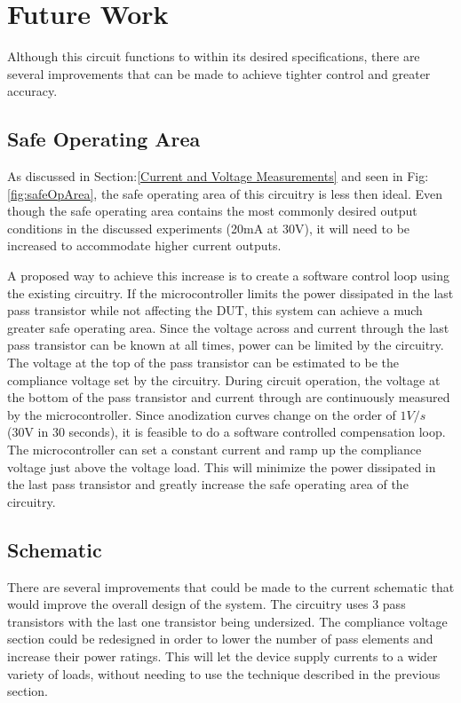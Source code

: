 \section{Future Work}

Although this circuit functions to within its desired specifications, there are several improvements that can be made to achieve tighter control and greater accuracy.

\subsection{Safe Operating Area}

As discussed in Section:\ref{Current and Voltage Measurements} and seen in Fig:\ref{fig:safeOpArea}, the safe operating area of this circuitry is less then ideal. Even though the safe operating area contains the most commonly desired output conditions in the discussed experiments (20mA at 30V), it will need to be increased to accommodate higher current outputs.

A proposed way to achieve this increase is to create a software control loop using the existing circuitry. If the microcontroller limits the power dissipated in the last pass transistor while not affecting the DUT, this system can achieve a much greater safe operating area. Since the voltage across and current through the last pass transistor can be known at all times, power can be limited by the circuitry. The voltage at the top of the pass transistor can be estimated to be the compliance voltage set by the circuitry. During circuit operation, the voltage at the bottom of the pass transistor and current through are continuously measured by the microcontroller. Since anodization curves change on the order of $1 V/s$ (30V in 30 seconds), it is feasible to do a software controlled compensation loop. The microcontroller can set a constant current and ramp up the compliance voltage just above the voltage load. This will minimize the power dissipated in the last pass transistor and greatly increase the safe operating area of the circuitry.

\subsection{Schematic}

There are several improvements that could be made to the current schematic that would improve the overall design of the system. The circuitry uses 3 pass transistors with the last one transistor being undersized. The compliance voltage section could be redesigned in order to lower the number of pass elements and increase their power ratings. This will let the device supply currents to a wider variety of loads, without needing to use the technique described in the previous section.  
